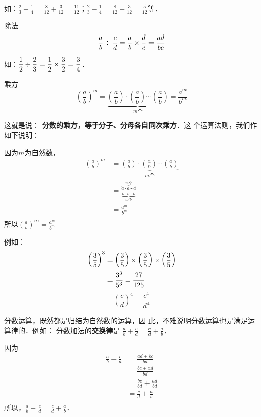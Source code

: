 如：$\frac{2}{3}+\frac{1}{4}=\frac{8}{12}+\frac{3}{12}=\frac{11}{12}$；$\frac{2}{3}-\frac{1}{4}=\frac{8}{12}-\frac{3}{12}=\frac{5}{12}$等．

\begin{blk}{除法}
    \[\dfrac{a}{b}\div \dfrac{c}{d}=\dfrac{a}{b}\times\dfrac{d}{c}=\dfrac{ad}{bc}\]
\end{blk}

如：$\dfrac{1}{2}\div\dfrac{2}{3}=\dfrac{1}{2}\times \dfrac{3}{2}=\dfrac{3}{4}$．

\begin{blk}{乘方}
    \[\left(\frac{a}{b}\right)^m=\underbrace{\left(\frac{a}{b}\right)\cdot \left(\frac{a}{b}\right)\cdots \left(\frac{a}{b}\right)}_{\text{$m$个}}=\frac{a^m}{b^m}\]
\end{blk}

这就是说：
\textbf{分数的乘方，等于分子、分母各自同次乘方}．这
个运算法则，我们作如下说明：

\begin{note}
    因为$m$为自然数，
\begin{align*}
    \left(\frac{a}{b}\right)^m&=\underbrace{\left(\frac{a}{b}\right)\cdot \left(\frac{a}{b}\right)\cdots \left(\frac{a}{b}\right)}_{\text{$m$个}}
 \tag{乘方的意义}\\
&=\frac{\overbrace{a\cdot a\cdots a}^{\text{$m$个}}}{\underbrace{b\cdot b\cdots b}_{\text{$m$个}}} \tag{分数乘法法则}\\
&= \frac{a^m}{b^m}\tag{乘方的意义}\\
\end{align*}
所以$\left(\frac{a}{b}\right)^m=\frac{a^m}{b^m}$
\end{note}

例如：
\[ \begin{split}
    \left(\dfrac{3}{5}\right)^3&=\left(\dfrac{3}{5}\right)\times \left(\dfrac{3}{5}\right)\times \left(\dfrac{3}{5}\right)\\
    &=\dfrac{3^3}{5^3}=\dfrac{27}{125}
\end{split} \]
\[ \left(\frac{c}{d}\right)^4=\frac{c^4}{d^4} \]

分数运算，既然都是归结为自然数的运算，因
此，不难说明分数运算也是满足运算律的．例如：
分数加法的\textbf{交换律}是
$\frac{a}{b}+\frac{c}{d}=\frac{c}{d}+\frac{a}{b}$．

\begin{note}
    因为
    \begin{align*}
        \frac{a}{b}+\frac{c}{d}&=\frac{ad+bc}{bd} \tag{分数加法法则}\\
        &=\frac{bc+ad}{bd}\tag{自然数加法交换律}\\
        &=\frac{bc}{bd}+\frac{ad}{bd}\\
        &=\frac{c}{d}+\frac{a}{b}\tag{分数的基本性质}\\
    \end{align*}
    所以，$\frac{a}{b}+\frac{c}{d}=\frac{c}{d}+\frac{a}{b}$．
\end{note}

